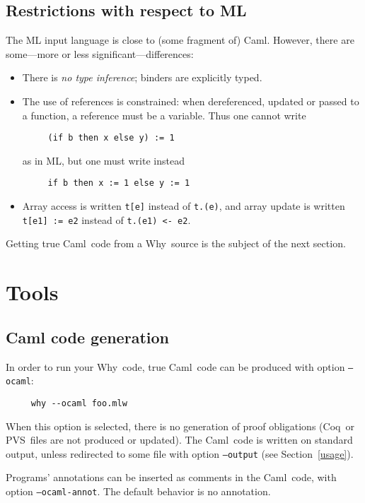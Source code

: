 \documentclass[a4paper,12pt]{report}
\makeatletter
\newcommand{\caml}{\textsf{Caml}}
\newcommand{\pvs}{\textsf{PVS}\index{PVS@\textsf{PVS}}}
\newcommand{\coq}{\textsf{Coq}\index{Coq@\textsf{Coq}}}
\newcommand{\why}{\textsf{Why}}
\makeatother
\begin{document}
\subsection{Restrictions with respect to ML}
The ML input language is close to (some fragment of) \caml. However,
there are some---more or less significant---differences:
\begin{itemize}
\item There is \textit{no type inference}; binders are explicitly
  typed. 
\item The use of references is constrained: when dereferenced, updated
  or passed to a function, a reference must be a variable. Thus one
  cannot write
\begin{verbatim}
     (if b then x else y) := 1
\end{verbatim}
as in ML, but one must write instead
\begin{verbatim}
     if b then x := 1 else y := 1
\end{verbatim}
\item Array access is written \texttt{t[e]} instead of \texttt{t.(e)},
  and array update is written \texttt{t[e1] := e2} instead of
  \texttt{t.(e1) <- e2}.
\end{itemize}
Getting true \caml\ code from a \why\ source is the subject of the
next section.



\section{Tools}

\subsection{Caml code generation}
\label{ocamlcode}
In order to run your \why\ code, true \caml\ code can be
produced with option \texttt{--ocaml}: 
\begin{verbatim}
     why --ocaml foo.mlw
\end{verbatim}
When this option is selected, there is no generation of proof
obligations (\coq\ or \pvs\ files are not produced or updated).
The \caml\ code is written on standard output, unless redirected to
some file with option \texttt{--output} (see Section~\ref{usage}).

Programs' annotations can be inserted as comments in the \caml\ code,
with option \texttt{--ocaml-annot}. The default behavior is no
annotation. 
\end{document}
